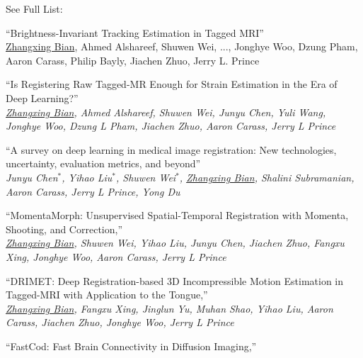 

\small{See Full List: \href{https://scholar.google.com/citations?user=i2oLdaYAAAAJ}{\color{cyan}{Google Scholar}}}
\begin{cventries}

 \cventry
    {} %
    {} %
    {} %
    {} %
    {\vspace{-1em}
      \begin{cvitems} %
      \item {``Brightness-Invariant Tracking Estimation in Tagged MRI'' \\
      \underline{Zhangxing Bian}, Ahmed Alshareef, Shuwen Wei, ..., Jonghye Woo, Dzung Pham, Aaron Carass, Philip Bayly, Jiachen Zhuo, Jerry L. Prince}
      	 \item {``Is Registering Raw Tagged-MR Enough for Strain Estimation in the Era of Deep Learning?''  \\
      		\textit{\underline{Zhangxing Bian}, Ahmed Alshareef, Shuwen Wei, Junyu Chen, Yuli Wang, Jonghye Woo, Dzung L Pham, Jiachen Zhuo, Aaron Carass, Jerry L Prince}}
            \item {``A survey on deep learning in medical image registration: New technologies, uncertainty, evaluation metrics, and beyond''  \\
      \textit{Junyu Chen$^*$, Yihao Liu$^*$, Shuwen Wei$^*$, \underline{Zhangxing Bian}, Shalini Subramanian, Aaron Carass, Jerry L Prince, Yong Du}
      }
      \item {``MomentaMorph: Unsupervised Spatial-Temporal Registration with Momenta, Shooting, and Correction,''  \\
      \textit{\underline{Zhangxing Bian}, Shuwen Wei, Yihao Liu, Junyu Chen, Jiachen Zhuo, Fangxu Xing, Jonghye Woo, Aaron Carass, Jerry L Prince}}
%
\item {``DRIMET: Deep Registration-based 3D Incompressible Motion Estimation in Tagged-MRI with Application to the Tongue,'' {} \\
       \textit{\underline{Zhangxing Bian}, Fangxu Xing, Jinglun Yu, Muhan Shao, Yihao Liu, Aaron Carass, Jiachen Zhuo, Jonghye Woo, Jerry L Prince}}
%
\item {``FastCod: Fast Brain Connectivity in Diffusion Imaging,''  \\
}
\end{cvitems}}
\end{cventries}
